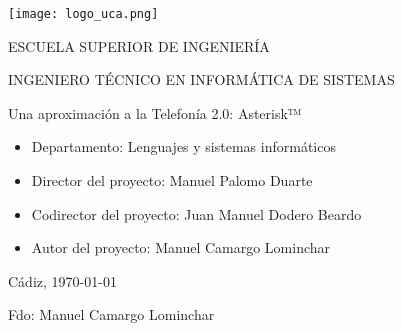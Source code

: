
\begin{center}

  \texttt{[image: logo\_uca.png]} 

  \vspace{2.0cm}

  \Large{ESCUELA SUPERIOR DE INGENIERÍA} 

  \vspace{1.0cm}

  \large{INGENIERO TÉCNICO EN INFORMÁTICA DE SISTEMAS} 

  \vspace{2.0cm}

  \large{Una aproximación a la Telefonía 2.0: Asterisk™} 

  \vspace{1.0cm}

\end{center}

\begin{itemize} 
\item \large{Departamento: Lenguajes y sistemas informáticos}
\item \large{Director del proyecto: Manuel Palomo Duarte}
\item \large{Codirector del proyecto: Juan Manuel Dodero Beardo}
\item \large{Autor del proyecto: Manuel Camargo Lominchar}
\end{itemize}

\vspace{1.0cm}

\begin{flushright}
  \large{Cádiz, \today} 

  \vspace{3.5cm}

  \large{Fdo: Manuel Camargo Lominchar}
\end{flushright}
